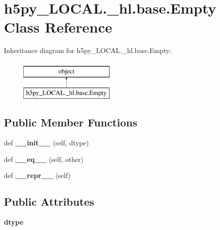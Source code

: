 \hypertarget{classh5py__LOCAL_1_1__hl_1_1base_1_1Empty}{}\section{h5py\+\_\+\+L\+O\+C\+A\+L.\+\_\+hl.\+base.\+Empty Class Reference}
\label{classh5py__LOCAL_1_1__hl_1_1base_1_1Empty}
Inheritance diagram for h5py\+\_\+\+L\+O\+C\+A\+L.\+\_\+hl.\+base.\+Empty\+:\begin{figure}[H]
\begin{center}
\leavevmode
\includegraphics[height=2.000000cm]{classh5py__LOCAL_1_1__hl_1_1base_1_1Empty}
\end{center}
\end{figure}
\subsection*{Public Member Functions}
\begin{DoxyCompactItemize}
\item 
\mbox{\label{classh5py__LOCAL_1_1__hl_1_1base_1_1Empty_aa6866c10099137646a46d4440891c973}} 
def {\bfseries \+\_\+\+\_\+init\+\_\+\+\_\+} (self, dtype)
\item 
\mbox{\label{classh5py__LOCAL_1_1__hl_1_1base_1_1Empty_af288a4bbb82bd33015b90e9f582a9636}} 
def {\bfseries \+\_\+\+\_\+eq\+\_\+\+\_\+} (self, other)
\item 
\mbox{\label{classh5py__LOCAL_1_1__hl_1_1base_1_1Empty_a708793279633749c11e458b9338b028c}} 
def {\bfseries \+\_\+\+\_\+repr\+\_\+\+\_\+} (self)
\end{DoxyCompactItemize}
\subsection*{Public Attributes}
\begin{DoxyCompactItemize}
\item 
\mbox{\label{classh5py__LOCAL_1_1__hl_1_1base_1_1Empty_a5d0366433e2edc24c480592a96b67d1a}} 
{\bfseries dtype}
\end{DoxyCompactItemize}
